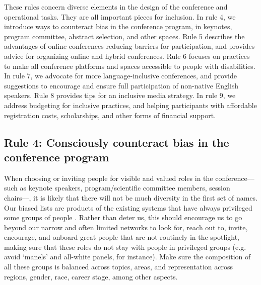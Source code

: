 \documentclass[10pt,letterpaper]{article}
\begin{document}
These rules concern diverse elements in the design of the conference and operational tasks. They are all important pieces for inclusion.
In rule 4, we introduce ways to counteract bias in the conference program, in keynotes, program committee, abstract selection, and other spaces. 
Rule 5 describes the advantages of online conferences reducing barriers for participation, and provides advice for organizing online and hybrid conferences.
Rule 6 focuses on practices to make all conference platforms and spaces accessible to people with disabilities. 
In rule 7, we advocate for more language-inclusive conferences, and provide suggestions to encourage and ensure full participation of non-native English speakers. 
Rule 8 provides tips for an inclusive media strategy. 
In rule 9, we address budgeting for inclusive practices, and helping participants with affordable registration costs, scholarships, and other forms of financial support.


\subsection*{Rule 4: Consciously counteract bias in the conference program}
\label{rule_unbias}

When choosing or inviting people for visible and valued roles in the conference––such as keynote speakers, program/scientific committee members, session chairs––, it is likely that there will not be much diversity in the first set of names.
Our biased lists are products of the existing systems that have always privileged some groups of people \cite{dwyerNoticeWhoScience2021,swartzScienceValueDiversity2019,wongBuildDiversityScience2020,dignazioUnicornsJanitorsNinjas2020}. 
Rather than deter us, this should encourage us to go beyond our narrow and often limited networks to look for, reach out to, invite, encourage, and onboard great people that are not routinely in the spotlight, making sure that these roles do not stay with people in privileged groups (e.g. avoid `manels' and all-white panels, for instance).
Make sure the composition of all these groups is balanced across topics, areas, and representation across regions, gender, race, career stage, among other aspects.



\end{document}
